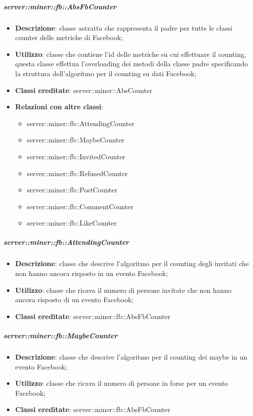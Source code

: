		\subparagraph{server::miner::fb::AbsFbCounter} %
		\label{subp:server_miner_fb_AbsFbCounter}
			\begin{itemize}
				\item \textbf{Descrizione}: classe astratta che rappresenta il padre per tutte le classi counter delle metriche di Facebook;
				\item \textbf{Utilizzo}: classe che contiene l'id delle metriche su cui effettuare il counting, questa classe effettua l'overloading dei metodi della classe padre specificando la struttura dell'algoritmo per il counting su dati Facebook;
				\item \textbf{Classi ereditate}: server::miner::AbsCounter
				\item \textbf{Relazioni con altre classi}:
					\begin{itemize}
						\item server::miner::fb::AttendingCounter
						\item server::miner::fb::MaybeCounter
						\item server::miner::fb::InvitedCounter
						\item server::miner::fb::RefusedCounter
						\item server::miner::fb::PostCounter
						\item server::miner::fb::CommentCounter
						\item server::miner::fb::LikeCounter
					\end{itemize}
			\end{itemize}

		\subparagraph{server::miner::fb::AttendingCounter} %
		\label{subp:server_miner_fb_AttendingCounter}
			\begin{itemize}
				\item \textbf{Descrizione}: classe che descrive l'algoritmo per il counting degli invitati che non hanno ancora risposto in un evento Facebook;
				\item \textbf{Utilizzo}: classe che ricava il numero di persone invitate che non hanno ancora risposto di un evento Facebook;
				\item \textbf{Classi ereditate}: server::miner::fb::AbsFbCounter
			\end{itemize}

		\subparagraph{server::miner::fb::MaybeCounter} %
		\label{subp:server_miner_fb_MaybeCounter}
			\begin{itemize}
				\item \textbf{Descrizione}: classe che descrive l'algoritmo per il counting dei maybe in un evento Facebook;
				\item \textbf{Utilizzo}: classe che ricava il numero di persone in forse per un evento Facebook;
				\item \textbf{Classi ereditate}: server::miner::fb::AbsFbCounter
			\end{itemize}

